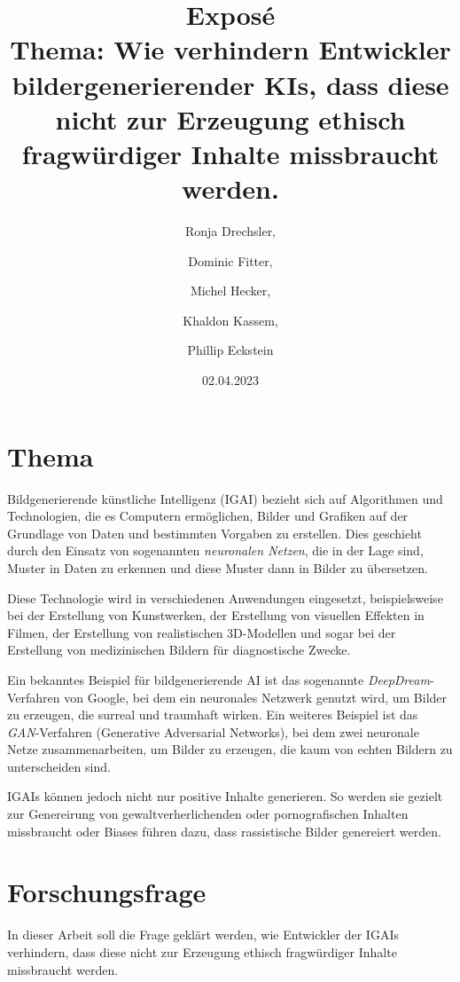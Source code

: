 \documentclass[12pt]{article}
\title{Exposé \\[1ex] \large Thema: Wie verhindern Entwickler bildergenerierender KIs, dass diese nicht zur Erzeugung ethisch fragwürdiger Inhalte missbraucht werden.}
\date{02.04.2023}
\author{Ronja Drechsler, \and Dominic Fitter, \and Michel Hecker, \and Khaldon Kassem, \and Phillip Eckstein}
\begin{document}
\maketitle

\section{Thema}
Bildgenerierende künstliche Intelligenz (IGAI) bezieht sich auf Algorithmen und Technologien, die es Computern ermöglichen, Bilder und Grafiken auf der Grundlage von Daten und bestimmten Vorgaben zu erstellen. Dies geschieht durch den Einsatz von sogenannten \emph{neuronalen Netzen}, die in der Lage sind, Muster in Daten zu erkennen und diese Muster dann in Bilder zu übersetzen.

Diese Technologie wird in verschiedenen Anwendungen eingesetzt, beispielsweise bei der Erstellung von Kunstwerken, der Erstellung von visuellen Effekten in Filmen, der Erstellung von realistischen 3D-Modellen und sogar bei der Erstellung von medizinischen Bildern für diagnostische Zwecke.

Ein bekanntes Beispiel für bildgenerierende AI ist das sogenannte \emph{DeepDream}-Verfahren von Google, bei dem ein neuronales Netzwerk genutzt wird, um Bilder zu erzeugen, die surreal und traumhaft wirken. Ein weiteres Beispiel ist das \emph{GAN}-Verfahren (Generative Adversarial Networks), bei dem zwei neuronale Netze zusammenarbeiten, um Bilder zu erzeugen, die kaum von echten Bildern zu unterscheiden sind.

IGAIs können jedoch nicht nur positive Inhalte generieren. So werden sie gezielt zur Genereirung von gewaltverherlichenden oder pornografischen Inhalten missbraucht oder Biases führen dazu, dass rassistische Bilder genereiert werden.
\section{Forschungsfrage}
In dieser Arbeit soll die Frage geklärt werden, wie Entwickler der IGAIs verhindern, dass diese nicht zur Erzeugung ethisch fragwürdiger Inhalte missbraucht werden.
\end{document}
